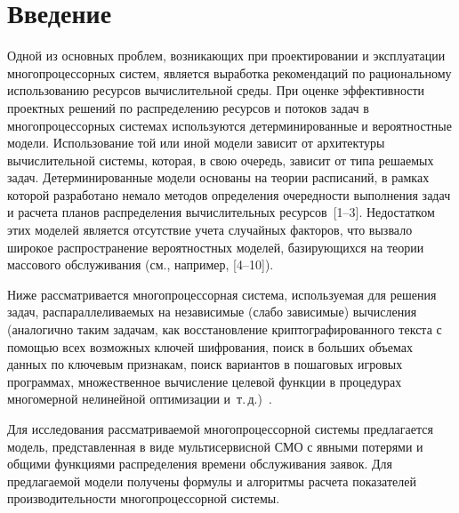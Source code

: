       \begin{multicols}{2}
      
            \label{st\stat}

     
\section{Введение}
     
     Одной из основных проблем, возникающих при проектировании и 
эксплуатации многопроцессорных сис\-тем, является выработка рекомендаций 
по рациональному использованию ресурсов вычислительной среды. При оценке 
эффективности проектных решений по распределению ресурсов и потоков 
задач в многопроцессорных сис\-те\-мах используются детерминированные и 
вероятностные модели. Использование той или иной модели зависит от 
архитектуры вычислительной сис\-те\-мы, которая, в свою очередь, зависит от 
типа решаемых задач. Детерминированные модели основаны на теории 
расписаний, в рамках которой разработано немало методов определения 
очередности выполнения задач и расчета планов распределения 
вычислительных ресурсов~[1--3]. Недостатком этих моделей является 
отсутствие учета случайных факторов, что вызвало широкое распространение 
вероятностных моделей, базирующихся на теории массового обслуживания 
(см., например, [4--10]). 
     
     Ниже рассматривается многопроцессорная сис\-те\-ма, используемая для 
решения задач, распараллеливаемых на независимые (слабо зависимые)\linebreak 
вы\-чис\-ле\-ния (аналогично таким задачам, как восстановление 
криптографированного текста с по\-мощью всех возможных ключей 
шифрования, \mbox{поиск} в больших объемах данных по ключевым признакам, поиск 
вариантов в пошаговых игровых программах, множественное вы\-чис\-ле\-ние 
целевой функции в процедурах многомерной нелинейной оптимизации 
и~т.\,д.)~\cite{3ag, 11ag, 12ag}. 
     
     Для исследования рассматриваемой многопроцессорной сис\-те\-мы 
предлагается модель, пред\-став\-лен\-ная в виде мультисервисной СМО 
с явными потерями и общими функциями 
распределения времени обслуживания заявок. Для предлагаемой \mbox{модели} 
получены формулы и алгоритмы расчета показателей производительности многопроцессорной системы. 

\begin{figure*} %
\vspace*{1pt}
\begin{center}
\mbox{%
\epsfxsize=103.258mm
}
\end{center}
\vspace*{-9pt}
\end{figure*}


\end{multicols}
